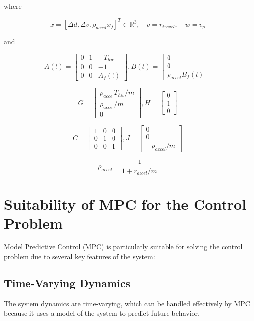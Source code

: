 \documentclass[12pt]{report}
\begin{document}
where

\[
x = [\Delta d, \Delta v, \rho_{accel}x_f]^T \in \mathbb{R}^3, \quad v = r_{travel}, \quad w = \dot{v}_p
\]

and

\[
A(t) = 
\begin{bmatrix}
0 & 1 & -T_{hw} \\
0 & 0 & -1 \\
0 & 0 & A_f(t)
\end{bmatrix}, 
B(t) = 
\begin{bmatrix}
0 \\
0 \\
\rho_{accel}B_f(t)
\end{bmatrix}
\]

\[
G = 
\begin{bmatrix}
\rho_{accel}T_{hw}/m \\
\rho_{accel}/m \\
0
\end{bmatrix}, 
H = 
\begin{bmatrix}
0 \\
1 \\
0
\end{bmatrix}
\]

\[
C = 
\begin{bmatrix}
1 & 0 & 0 \\
0 & 1 & 0 \\
0 & 0 & 1
\end{bmatrix}, 
J = 
\begin{bmatrix}
0 \\
0 \\
-\rho_{accel}/m
\end{bmatrix}
\]

\[
\rho_{accel} = \frac{1}{1 + r_{accel}/m}
\]

\chapter{Suitability of MPC for the Control Problem}

Model Predictive Control (MPC) is particularly suitable for solving the control problem due to several key features of the system:

\section{Time-Varying Dynamics}
The system dynamics are time-varying, which can be handled effectively by MPC because it uses a model of the system to predict future behavior.
\end{document}
